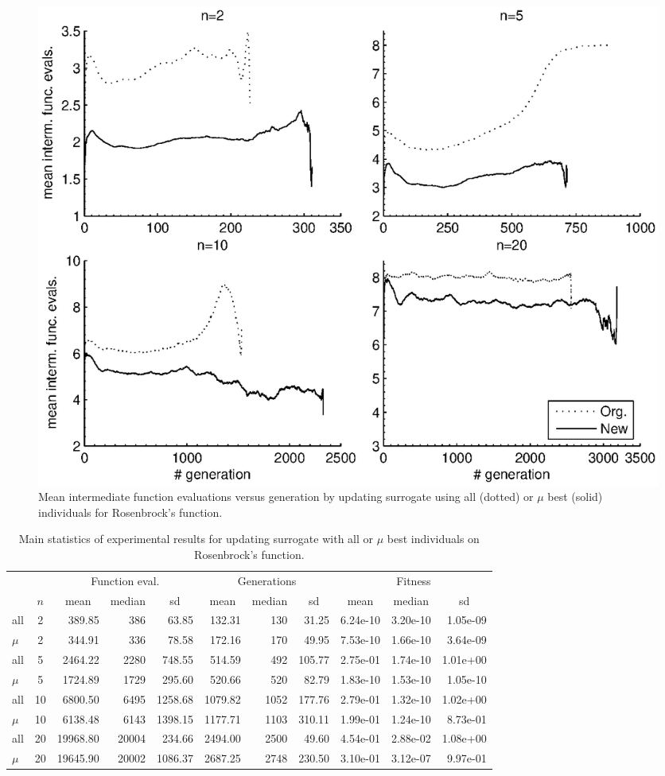 \documentclass[10pt, conference]{IEEEtran} %
\begin{document}
\begin{figure}[t!]
\centering
\includegraphics[trim = 15mm 10mm 15mm 5mm, clip, width=0.8\columnwidth]{rosen_intmEvals_gen}
\caption{Mean intermediate function evaluations versus generation by updating surrogate using all (dotted) or $\mu$ best (solid) individuals for Rosenbrock's function.}
\label{fig:rosenIntmEval}
\end{figure}

\begin{table}[t!]
\centering
{\renewcommand{\arraystretch}{1.1} \renewcommand{\tabcolsep}{0.02cm} \scriptsize%
\begin{tabularx}{0.99\columnwidth}{| X | c | rrr | rrr| rrr |}
\hline
 & & \multicolumn{3}{c|}{Function eval.} & \multicolumn{3}{c|}{Generations} & \multicolumn{3}{c|}{Fitness} \\ 
     & $n$ & \multicolumn{1}{|c}{mean} & \multicolumn{1}{c}{median} & \multicolumn{1}{c|}{sd} & \multicolumn{1}{|c}{mean} & \multicolumn{1}{c}{median} & \multicolumn{1}{c|}{sd} & \multicolumn{1}{|c}{mean} & \multicolumn{1}{c}{median} & \multicolumn{1}{c|}{sd} \\
\hline
all & 2 & 389.85 & 386 & 63.85 & 132.31 & 130 & 31.25 & 6.24e-10 & 3.20e-10 & 1.05e-09\\ 
$\mu$ & 2 & 344.91 & 336 & 78.58 & 172.16 & 170 & 49.95 & 7.53e-10 & 1.66e-10 & 3.64e-09\\ \hline
all & 5 & 2464.22 & 2280 & 748.55 & 514.59 & 492 & 105.77 & 2.75e-01 & 1.74e-10 & 1.01e+00\\ 
$\mu$ & 5 & 1724.89 & 1729 & 295.60 & 520.66 & 520 & 82.79 & 1.83e-10 & 1.53e-10 & 1.05e-10\\ \hline
all & 10 & 6800.50 & 6495 & 1258.68 & 1079.82 & 1052 & 177.76 & 2.79e-01 & 1.32e-10 & 1.02e+00\\ 
$\mu$ & 10 & 6138.48 & 6143 & 1398.15 & 1177.71 & 1103 & 310.11 & 1.99e-01 & 1.24e-10 & 8.73e-01\\ \hline
all & 20 & 19968.80 & 20004 & 234.66 & 2494.00 & 2500 & 49.60 & 4.54e-01 & 2.88e-02 & 1.08e+00\\ 
$\mu$ & 20 & 19645.90 & 20002 & 1086.37 & 2687.25 & 2748 & 230.50 & 3.10e-01 & 3.12e-07 & 9.97e-01\\ \hline
\end{tabularx}
}
\caption{Main statistics of experimental results for updating surrogate with all or $\mu$ best individuals on Rosenbrock's function.} \label{tbl:Rosenbrock}
\end{table}
\end{document}

